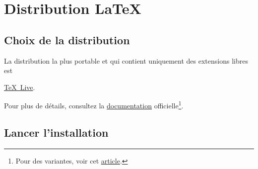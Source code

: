 \newpage






\section{Distribution \LaTeX}
\label{sec:distributionLaTeX}







\subsection{Choix de la distribution}

La distribution la plus portable et qui contient uniquement des extensions libres est
\begin{center}
	\href{http://www.tug.org/texlive/}{\TeX \ Live}.
\end{center}

Pour plus de détails, consultez la \href{http://tug.org/texlive/doc/texlive-fr/texlive-fr.pdf}{documentation} officielle\footnote{Pour des variantes, voir cet \href{http://tex.stackexchange.com/questions/239199/latex-distributions-what-are-their-main-differences}{article}.}.



\subsection{Lancer l'installation}

